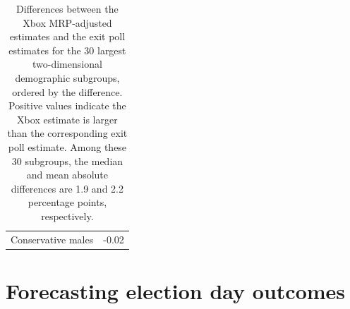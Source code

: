 \documentclass[preprint,authoryear,12pt]{elsarticle}
\begin{document}
\begin{table}[thbp]
\begin{center}
\begin{tabular}{l C{3cm}}
  Conservative males & -0.02 \\
\end{tabular}
  \caption{Differences between the Xbox MRP-adjusted estimates and the exit
    poll estimates for the 30 largest two-dimensional demographic subgroups, ordered by the difference.
    Positive values indicate the Xbox estimate is larger than the corresponding exit poll estimate.
    Among these 30 subgroups, the median and mean
    absolute differences are 1.9 and 2.2 percentage points,
    respectively. 
    }
\label{tab:large}
\end{center}
\end{table}

\section{Forecasting election day outcomes}
\label{sec:forecast}
\end{document}
